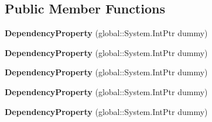 \subsection*{Public Member Functions}
\begin{DoxyCompactItemize}
\item 
\mbox{\label{class_windows_1_1_u_i_1_1_xaml_1_1_dependency_property_ad112850b158405d70382d210d92547dc}} 
{\bfseries Dependency\+Property} (global\+::\+System.\+Int\+Ptr dummy)
\item 
\mbox{\label{class_windows_1_1_u_i_1_1_xaml_1_1_dependency_property_ad112850b158405d70382d210d92547dc}} 
{\bfseries Dependency\+Property} (global\+::\+System.\+Int\+Ptr dummy)
\item 
\mbox{\label{class_windows_1_1_u_i_1_1_xaml_1_1_dependency_property_ad112850b158405d70382d210d92547dc}} 
{\bfseries Dependency\+Property} (global\+::\+System.\+Int\+Ptr dummy)
\item 
\mbox{\label{class_windows_1_1_u_i_1_1_xaml_1_1_dependency_property_ad112850b158405d70382d210d92547dc}} 
{\bfseries Dependency\+Property} (global\+::\+System.\+Int\+Ptr dummy)
\item 
\mbox{\label{class_windows_1_1_u_i_1_1_xaml_1_1_dependency_property_ad112850b158405d70382d210d92547dc}} 
{\bfseries Dependency\+Property} (global\+::\+System.\+Int\+Ptr dummy)
\end{DoxyCompactItemize}
